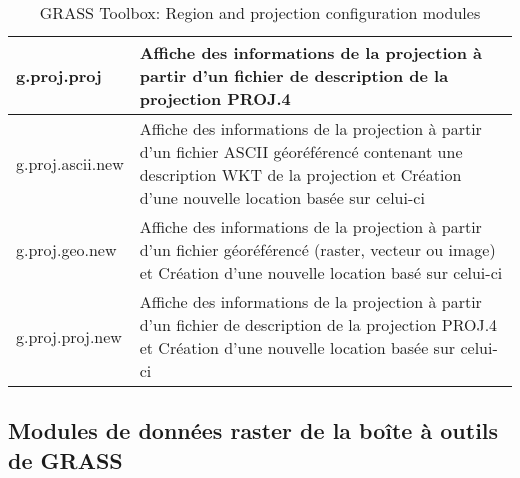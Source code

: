 \begin{table}[H]
\begin{tabular}{|p{4cm}|p{10cm}|}
  \hline g.proj.proj & Affiche des informations de la projection à partir d'un fichier de description de la projection PROJ.4 \\
  \hline g.proj.ascii.new & Affiche des informations de la projection à partir d'un fichier ASCII géoréférencé contenant une description WKT de la projection et Création d'une nouvelle location basée sur celui-ci \\
  \hline g.proj.geo.new &  Affiche des informations de la projection à partir d'un fichier géoréférencé (raster, vecteur ou image) et Création d'une nouvelle location basé sur celui-ci \\
  \hline g.proj.proj.new & Affiche des informations de la projection à partir d'un fichier de description de la projection PROJ.4 et Création d'une nouvelle location basée sur celui-ci \\
\hline
\end{tabular}
\caption{GRASS Toolbox: Region and projection configuration modules}
\end{table}

\subsection{Modules de données raster de la boîte à outils de GRASS}

